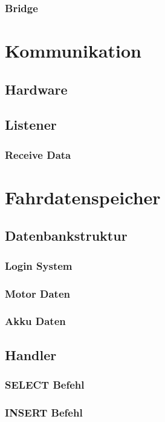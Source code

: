 \subsubsection{Bridge}


\section{Kommunikation}
\subsection{Hardware}
\subsection{Listener}
\subsubsection{Receive Data}


\section{Fahrdatenspeicher}
\subsection{Datenbankstruktur}
\subsubsection{Login System}
\subsubsection{Motor Daten}
\subsubsection{Akku Daten}
\subsection{Handler}
\subsubsection{SELECT Befehl}
\subsubsection{INSERT Befehl}
